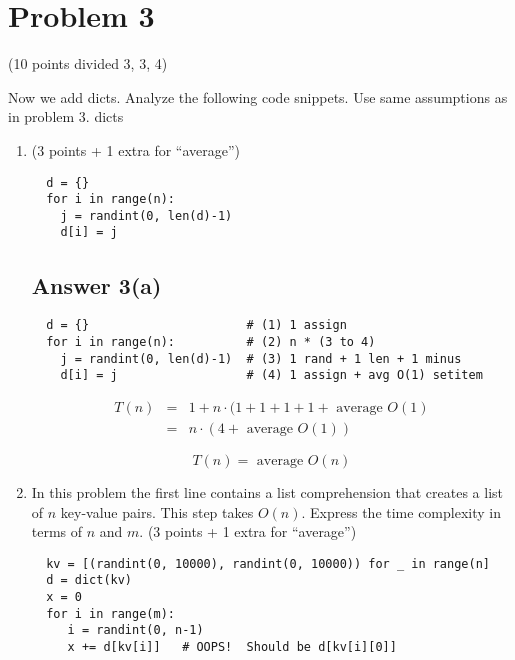 \documentclass{article}
\begin{document}
\section{Problem 3} (10 points divided 3, 3, 4)

Now we add dicts.  Analyze the following code snippets. Use same
assumptions as in problem 3.  dicts

\begin{enumerate}[label=(\alph*)]

\item (3 points + 1 extra for ``average'')
  
\begin{verbatim}
  d = {}
  for i in range(n):
    j = randint(0, len(d)-1)
    d[i] = j
\end{verbatim}

\subsection*{Answer 3(a)}

\begin{verbatim}
  d = {}                      # (1) 1 assign
  for i in range(n):          # (2) n * (3 to 4)
    j = randint(0, len(d)-1)  # (3) 1 rand + 1 len + 1 minus
    d[i] = j                  # (4) 1 assign + avg O(1) setitem
\end{verbatim}

\begin{eqnarray*}
  T(n) &=& 1 + n \cdot (1 + 1 + 1 + 1 + \text{ average } O(1) \\
       &=& n \cdot (4 + \text{ average } O(1))
\end{eqnarray*}

\begin{equation*}
  \boxed{T(n) = \text{ average } O(n)} 
\end{equation*}

\item In this problem the first line contains a list comprehension
  that creates a list of $n$ key-value pairs.  This step takes $O(n)$.
  Express the time complexity in terms of $n$ and $m$. (3 points + 1
  extra for ``average'')
  
\begin{verbatim}
  kv = [(randint(0, 10000), randint(0, 10000)) for _ in range(n]
  d = dict(kv)
  x = 0
  for i in range(m):
     i = randint(0, n-1)
     x += d[kv[i]]   # OOPS!  Should be d[kv[i][0]]
\end{verbatim}


\end{enumerate}
\end{document}
